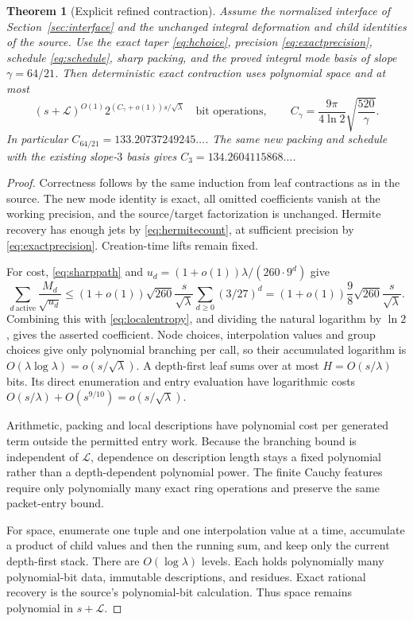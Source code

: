 \documentclass[11pt,letterpaper]{article}
\newtheorem{theorem}{Theorem}[section]
\theoremstyle{definition}\newtheorem{definition}[theorem]{Definition}
\theoremstyle{remark}\newtheorem{remark}[theorem]{Remark}
\newcommand{\LL}{\mathcal L}
\newcommand{\newconstant}{133.20737249245\ldots}
\begin{document}
\begin{theorem}[Explicit refined contraction]\label{thm:main}
Assume the normalized interface of Section~\ref{sec:interface} and the
unchanged integral deformation and child identities of the source.
Use the exact taper \eqref{eq:hchoice}, precision
\eqref{eq:exactprecision}, schedule \eqref{eq:schedule}, sharp packing,
and the proved integral mode basis of slope $\gamma=64/21$.
Then deterministic exact contraction uses polynomial space and at most
\[
 (s+\LL)^{O(1)}2^{(C_\gamma+o(1))s/\sqrt\lambda}
 \quad\text{bit operations},\qquad
 C_\gamma=\frac{9\pi}{4\ln2}\sqrt{\frac{520}{\gamma}}.
\]
In particular $C_{64/21}=\newconstant$. The same new packing and
schedule with the existing slope-$3$ basis gives
$C_3=134.2604115868\ldots$.
\end{theorem}
\begin{proof}
Correctness follows by the same induction from leaf contractions as in
the source. The new mode identity is exact, all omitted coefficients
vanish at the working precision, and the source/target factorization
is unchanged. Hermite recovery has enough jets by
\eqref{eq:hermitecount}, at sufficient precision by
\eqref{eq:exactprecision}. Creation-time lifts remain fixed.

For cost, \eqref{eq:sharppath} and
$u_d=(1+o(1))\lambda/(260\cdot9^d)$ give
\[
 \sum_{d\ \mathrm{active}}\frac{M_d}{\sqrt{u_d}}
 \le(1+o(1))\sqrt{260}\frac{s}{\sqrt\lambda}
     \sum_{d\ge0}(3/27)^d
 =(1+o(1))\frac98\sqrt{260}\frac{s}{\sqrt\lambda}.
\]
Combining this with \eqref{eq:localentropy}, and dividing the natural
logarithm by $\ln2$, gives the asserted coefficient. Node choices,
interpolation values and group choices give only polynomial branching
per call, so their accumulated logarithm is
$O(\lambda\log\lambda)=o(s/\sqrt\lambda)$. A depth-first leaf sums
over at most $H=O(s/\lambda)$ bits. Its direct enumeration and entry
evaluation have logarithmic costs
$O(s/\lambda)+O(s^{9/10})=o(s/\sqrt\lambda)$.

Arithmetic, packing and local descriptions have polynomial cost per
generated term outside the permitted entry work. Because the branching
bound is independent of $\LL$, dependence on description length stays
a fixed polynomial rather than a depth-dependent polynomial power.
The finite Cauchy features require only polynomially many exact ring
operations and preserve the same packet-entry bound.

For space, enumerate one tuple and one interpolation value at a time,
accumulate a product of child values and then the running sum, and keep
only the current depth-first stack. There are $O(\log\lambda)$ levels.
Each holds polynomially many polynomial-bit data, immutable descriptions,
and residues. Exact rational recovery is the source's polynomial-bit
calculation. Thus space remains polynomial in $s+\LL$.
\end{proof}
\end{document}
